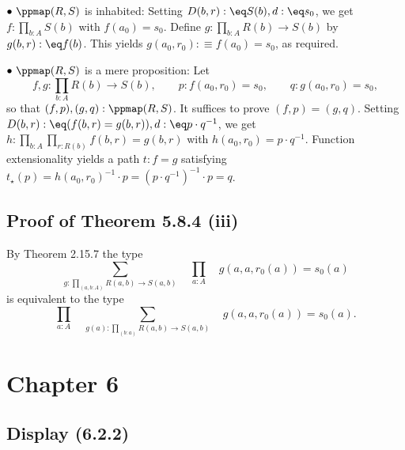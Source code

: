 \documentclass[12pt]{article}
\begin{document}
\nn$\bullet\ \ppmap(R,S)$ is inhabited: Setting $D(b,r):\eq S(b),d:\eq s_0$, we get $f:\prod_{b:A}S(b)$ with $f(a_0)=s_0$. Define $g:\prod_{b:A}R(b)\to S(b)$ by $g(b,r):\eq f(b)$. This yields $g(a_0,r_0):\equiv f(a_0)=s_0$, as required. 

\nn$\bullet\ \ppmap(R,S)$ is a mere proposition: Let 
$$
f,g:\prod_{b:A}R(b)\to S(b),\qquad p:f(a_0,r_0)=s_0,\qquad q:g(a_0,r_0)=s_0,
$$ 
so that $(f,p),(g,q):\ppmap(R,S)$. It suffices to prove $(f,p)=(g,q)$. Setting $D(b,r):\eq(f(b,r)=g(b,r)),d:\eq p\cdot q^{-1}$, we get $h:\prod_{b:A}\prod_{r:R(b)}f(b,r)=g(b,r)$ with $h(a_0,r_0)=p\cdot q^{-1}$. Function extensionality yields a path $t:f=g$ satisfying $t_\star(p)=h(a_0,r_0)^{-1}\cdot p=(p\cdot q^{-1})^{-1}\cdot p=q$.%


\subsection{Proof of Theorem 5.8.4 (iii)}

By Theorem 2.15.7 the type 
$$
\sum_{g:\prod_{(a,b:A)}R(a,b)\to S(a,b)}\quad\prod_{a:A}\quad g(a,a,r_0(a))=s_0(a)
$$ 
is equivalent to the type
$$
\prod_{a:A}\quad\sum_{g(a):\prod_{(b:a)}R(a,b)\to S(a,b)}\quad g(a,a,r_0(a))=s_0(a).
$$






\section{Chapter 6}

\subsection{Display (6.2.2)}
\end{document}
